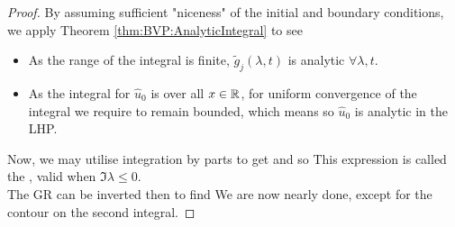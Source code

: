 \documentclass{article}
\begin{document}
\begin{proof}
By assuming sufficient "niceness" of the initial and boundary conditions, we apply Theorem \ref{thm:BVP:AnalyticIntegral} to see
\begin{itemize}
    \item As the range of the integral is finite, $\tilde{g}_j(\lambda,t)$ is analytic $\forall \lambda,t$. 
    \item As the integral for $\hat{u}_0$ is over all $x\in\mathbb{R}$, for uniform convergence of the integral we require 
    to remain bounded, which means
    so $\hat{u}_0$ is analytic in the LHP. 
\end{itemize}
Now, we may utilise integration by parts to get 
and so 
This expression is called the , valid when $\Im \lambda \leq 0$. \\
The GR can be inverted then to find 
We are now nearly done, except for the contour on the second integral.

\end{proof}
\end{document}
